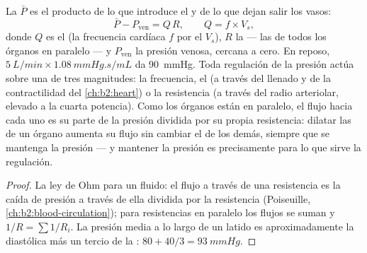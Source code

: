 \begin{theorem}\label{thm:b2:blood-pressure:equation}
La  $\bar P$ es el producto de lo que introduce el
 y de lo que dejan salir los vasos:
\[
\bar P - P_{\text{ven}} = Q\,R, \qquad Q = f\times V_s,
\]
donde $Q$ es el  (la frecuencia cardíaca $f$ por el  $V_s$), $R$ la  --- las  de
todos los órganos en paralelo --- y $P_{\text{ven}}$ la presión venosa,
cercana a cero. En reposo, $\qty{5}{L/min}\times\qty{1.08}{mmHg.s/mL}$ da
\qty{90}{mmHg}. Toda regulación de la presión actúa sobre una de tres
magnitudes: la frecuencia, el  (a través del llenado y de
la contractilidad del \cref{ch:b2:heart}) o la resistencia (a través del
radio arteriolar, elevado a la cuarta potencia). Como los órganos están en
paralelo, el flujo hacia cada uno es su parte de la presión dividida por su
propia resistencia: dilatar las  de un órgano aumenta su flujo
sin cambiar el de los demás, siempre que se mantenga la presión --- y
mantener la presión es precisamente para lo que sirve la regulación.
\end{theorem}
\begin{proof}
La ley de Ohm para un fluido: el flujo a través de una resistencia es la
caída de presión a través de ella dividida por la resistencia (Poiseuille,
\cref{ch:b2:blood-circulation}); para resistencias en paralelo los flujos se
suman y $1/R = \sum 1/R_i$. La presión media a lo largo de un latido es
aproximadamente la diastólica más un tercio de la :
$80 + 40/3 = \qty{93}{mmHg}$.
\end{proof}

